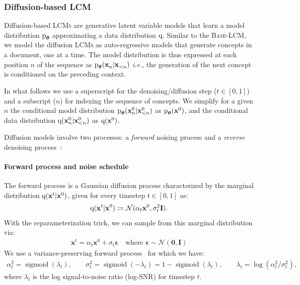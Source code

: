 \documentclass[twoside,11pt]{fairmeta}
\newcommand{\lcm}{\textsc{LCM}\xspace}
\newcommand{\lcms}{\textsc{LCMs}\xspace}
\newcommand{\mselcm}{\textsc{Base-LCM}\xspace}
\newcommand{\diffx}[2]{\rvx^{#1}_{#2}}
\DeclareMathOperator{\sigmoid}{sigmoid}
\newcommand{\ptheta}{\rp_\rvtheta}
\newcommand{\defeq}{\coloneqq}
\newcommand{\ie}{\textit{i.e.,}\xspace}
\def\rp{{\textnormal{p}}}
\def\rq{{\textnormal{q}}}
\def\rvepsilon{{\bm{\epsilon}}}
\def\rvtheta{{\bm{\theta}}}
\def\rvx{{\mathbf{x}}}
\def\rvzero{{\mathbf{0}}}
\def\rmI{{\mathbf{I}}}
\begin{document}
\subsubsection{Diffusion-based \lcm}
\label{sec:arch:diffsion:intro}

Diffusion-based \lcms are generative latent variable models that learn a model distribution $\ptheta$ approximating a data distribution $\rq$.
Similar to the \mselcm, we model the diffusion \lcms as auto-regressive models that generate concepts in a document, one at a time.
The model distribution is thus expressed at each position $n$ of the sequence as
$\ptheta(\diffx{}{n} | \diffx{}{<n})$ \ie the generation of the next concept is conditioned on the preceding context. 

In what follows we use a superscript for the denoising/diffusion step ($t\in[0, 1]$) and a subscript ($n$) for indexing the sequence of concepts. 
We simplify for a given $n$ the conditional model distribution 
$\ptheta(\diffx{0}{n} | \diffx{0}{<n})$
as 
$\ptheta(\diffx{0}{})$,
and the conditional data distribution 
$\rq(\diffx{0}{n}|\diffx{0}{<n})$ 
as 
$\rq(\diffx{0}{})$.

Diffusion models involve two processes: a \emph{forward} noising process and a \emph{reverse} denoising process~\citep{DDPM,DDIM}:
\paragraph{Forward process and noise schedule}
The forward process is a Gaussian diffusion process characterized by the marginal distribution $\rq(\diffx{t}{}|\diffx{0}{})$, given for every timestep $t \in [0,1]$ as:
\begin{align}
    \rq(\diffx{t}{}|\diffx{0}{}) \defeq \mathcal N(\alpha_t\diffx{0}{}, \sigma_t^2\rmI).
\end{align}
With the reparameterization trick, we can sample from this marginal distribution via:
\begin{align}
    \diffx{t}{} = \alpha_t\diffx{0}{} + \sigma_t\rvepsilon\quad\text{where } \rvepsilon\sim\mathcal N(\rvzero, \rmI)
    \label{eq:noising:reparam}
\end{align}
We use a variance-preserving forward process~\citep{karras2022elucidating} for which we have:
\begin{align}
    \alpha_t^2 = \sigmoid(\lambda_t), \quad
    \quad \sigma_t^2 = \sigmoid(-\lambda_t) = 1 - \sigmoid(\lambda_t), \quad
    \quad \lambda_t = \log\left({\alpha_t^2}/{\sigma_t^2}\right),
\end{align}
where $\lambda_t$ is the log signal-to-noise ratio (log-SNR) for timestep $t$.
\end{document}
